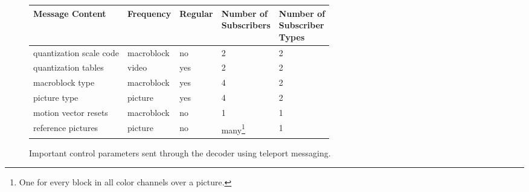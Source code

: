 \begin{figure}[h]
  \begin{center}
\begin{minipage}{\textwidth}
\renewcommand{\thempfootnote}{
  \arabic{footnote}
}
    \begin{tabular}{|p{1.7in}|l|l|p{0.9in}|p{0.9in}|}
\hline
\textbf{Message Content} & \textbf{Frequency} & \textbf{Regular} & \parbox{0.9in}{\textbf{Number of\\ Subscribers}} & \parbox{0.91in}{\vspace{0.04in} \textbf{Number of\\Subscriber\\Types} \vspace{0.04in}} \\
\hline
quantization scale code & macroblock & no & 2 & 2 \\
quantization tables & video & yes & 2 & 2 \\
macroblock type & macroblock & yes & 4 & 2 \\
picture type & picture & yes & 4 & 2 \\
motion vector resets & macroblock & no & 1 & 1 \\
\addtocounter{footnote}{1}
reference pictures & picture & no & many\footnote{One for every block in all color channels over a picture.} & 1 \\
\hline
    \end{tabular}
\end{minipage}
  \end{center}
  \caption{Important control parameters sent through the decoder using teleport messaging.}
  \label{table:enumerate_messages_decoder}
\end{figure}

